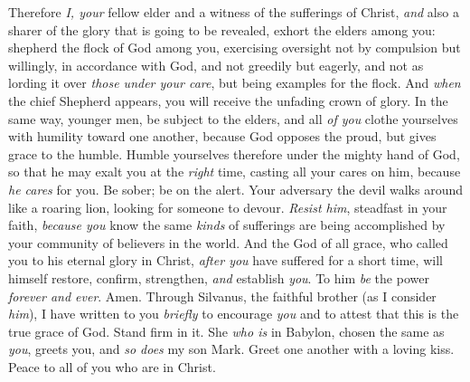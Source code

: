 \begin{biblechapter} %
 Therefore \textit{I, your} fellow elder and a witness of the sufferings of Christ, \textit{and} also a sharer of the glory that is going to be revealed, exhort the elders among you:
\verse shepherd the flock of God among you, exercising oversight not by compulsion but willingly, in accordance with God, and not greedily but eagerly,
\verse and not as lording it over \textit{those under your care}, but being examples for the flock.
\verse And \textit{when} the chief Shepherd appears, you will receive the unfading crown of glory.
\verse In the same way, younger men, be subject to the elders, and all \textit{of you} clothe yourselves with humility toward one another, because God opposes the proud, but gives grace to the humble.
\verse Humble yourselves therefore under the mighty hand of God, so that he may exalt you at the \textit{right} time,
\verse casting all your cares on him, because \textit{he cares} for you.
\verse Be sober; be on the alert. Your adversary the devil walks around like a roaring lion, looking for someone to devour.
\verse \textit{Resist him}, steadfast in your faith, \textit{because you} know the same \textit{kinds} of sufferings are being accomplished by your community of believers in the world.
\verse And the God of all grace, who called you to his eternal glory in Christ, \textit{after you} have suffered for a short time, will himself restore, confirm, strengthen, \textit{and} establish \textit{you}.
\verse To him \textit{be} the power \textit{forever and ever}. Amen.
 Through Silvanus, the faithful brother (as I consider \textit{him}), I have written to you \textit{briefly} to encourage \textit{you} and to attest that this is the true grace of God. Stand firm in it.
\verse She \textit{who is} in Babylon, chosen the same as \textit{you}, greets you, and \textit{so does} my son Mark.
\verse Greet one another with a loving kiss. Peace to all of you who are in Christ.
\end{biblechapter}

